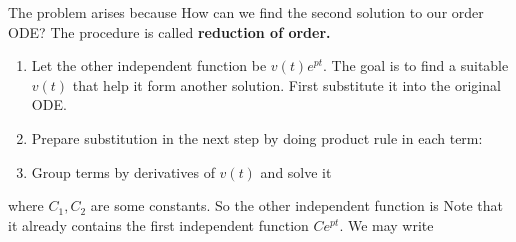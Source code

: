 \documentclass[class=article, crop=false, 12pt]{standalone}
\begin{document}
The problem arises because  
How can we find the second solution to our  order ODE? 
The procedure is called \bf{reduction of order}.

\begin{enumerate}
    \item Let the other independent function be $v(t)e^{pt}$. 
    The goal is to find a suitable $v(t)$ that help it form another solution. 
    First substitute it into the original ODE.

    \item Prepare substitution in the next step by doing product rule in each term:

    \item Group terms by derivatives of $v(t)$ and solve it
\end{enumerate}

where $C_1, C_2$ are some constants. 
So the other independent function is 
Note that it already contains the first independent function $C e^{pt}$.
We may write 
\end{document}
